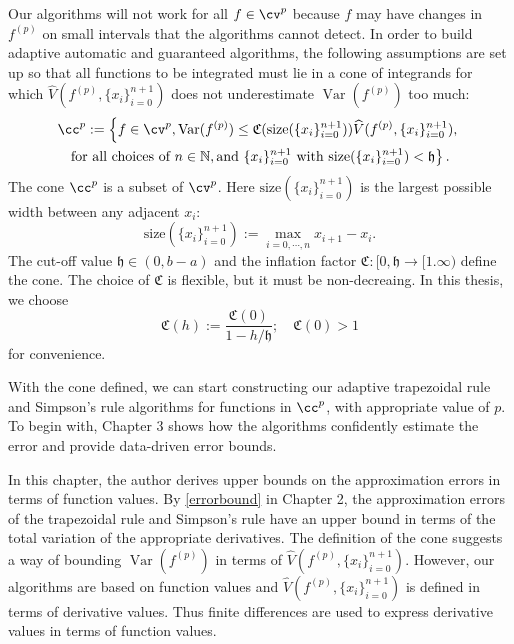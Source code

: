 \documentclass{iitthesis}
\DeclareMathOperator{\Var}{Var}
\theoremstyle{definition}
\theoremstyle{remark}
\begin{document}
Our algorithms will not work for all $f \in \cv^{p}$ because $f$ may have changes in $f^{(p)}$ on small intervals that the algorithms cannot detect. In order to build adaptive automatic and guaranteed algorithms, the following assumptions are set up so that all functions to be integrated must lie in a cone of integrands for which $\widehat{V}(f^{(p)},\{x_i\}_{i=0}^{n+1})$ does not underestimate $\Var(f^{(p)})$ too much:
\begin{multline}\label{defcone}
\cc^{p}:=\left\{f\in \cv^{p}, \Var(f^{(p)})\leq \mathfrak{C}(\text{size}(\{x_i\}_{i=0}^{n+1}))\widehat{V}(f^{(p)},\{x_i\}_{i=0}^{n+1}),\right.\\ \left.\text{for all choices of } n\in \mathbb{N}, \text{and }\{x_i\}_{i=0}^{n+1} \text{ with }\text{size}(\{x_i\}_{i=0}^{n+1})<\mathfrak{h}\right\}.
\end{multline}
The cone $\cc^{p}$ is a subset of $\cv^{p}$. Here $\text{size}(\{x_i\}_{i=0}^{n+1})$ is the largest possible width between any adjacent $x_i$:
\begin{equation}\label{defsize}
  \text{size}(\{x_i\}_{i=0}^{n+1}):=\max_{i=0,\cdots, n} x_{i+1}-x_{i}.
\end{equation}
The cut-off value $\mathfrak{h} \in (0, b-a)$ and the inflation factor $\mathfrak{C}: [0,\mathfrak{h} \rightarrow [1.\infty)$ define the cone. The choice of $\mathfrak{C}$ is flexible, but it must be non-decreaing. In this thesis, we choose
\begin{equation}\label{definflationfactor}
  \mathfrak{C}(h):=\frac{\mathfrak{C}(0)}{1-h/\mathfrak{h}}; \quad \mathfrak{C}(0)>1
\end{equation}
for convenience.

With the cone defined, we can start constructing our adaptive trapezoidal rule and Simpson's rule algorithms for functions in $\cc^{p}$, with appropriate value of $p$. To begin with, Chapter 3 shows how the algorithms confidently estimate the error and provide data-driven error bounds.





In this chapter, the author derives upper bounds on the approximation errors in terms of function values. By \eqref{errorbound} in Chapter 2, the approximation errors of the trapezoidal rule and Simpson's rule have an upper bound in terms of the total variation of the appropriate derivatives. The definition of the cone suggests a way of bounding $\Var(f^{(p)})$ in terms of $\widehat{V}(f^{(p)},\{x_i\}_{i=0}^{n+1})$. However, our algorithms are based on function values and $\widehat{V}(f^{(p)},\{x_i\}_{i=0}^{n+1})$ is defined in terms of derivative values. Thus finite differences are used to express derivative values in terms of function values.
\end{document}
